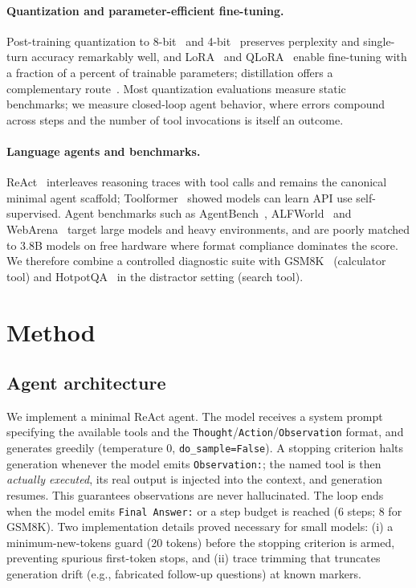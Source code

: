 \documentclass{article}
\begin{document}
\paragraph{Quantization and parameter-efficient fine-tuning.}
Post-training quantization to 8-bit~\cite{dettmers2022llmint8} and
4-bit~\cite{frantar2023gptq,dettmers2023qlora} preserves perplexity and
single-turn accuracy remarkably well, and LoRA~\cite{hu2022lora} and
QLoRA~\cite{dettmers2023qlora} enable fine-tuning with a fraction of a
percent of trainable parameters; distillation offers a complementary
route~\cite{gu2024minillm}. Most quantization evaluations measure static
benchmarks; we measure closed-loop agent behavior, where errors compound
across steps and the number of tool invocations is itself an outcome.

\paragraph{Language agents and benchmarks.}
ReAct~\cite{yao2023react} interleaves reasoning traces with tool calls
and remains the canonical minimal agent scaffold;
Toolformer~\cite{schick2023toolformer} showed models can learn API use
self-supervised. Agent benchmarks such as AgentBench~\cite{liu2024agentbench},
ALFWorld~\cite{shridhar2021alfworld} and WebArena~\cite{zhou2024webarena}
target large models and heavy environments, and are poorly matched to 3.8B
models on free hardware where format compliance dominates the score. We
therefore combine a controlled diagnostic suite with
GSM8K~\cite{cobbe2021gsm8k} (calculator tool) and
HotpotQA~\cite{yang2018hotpotqa} in the distractor setting (search tool).

\section{Method}
\label{sec:method}

\subsection{Agent architecture}
We implement a minimal ReAct agent. The model receives a system prompt
specifying the available tools and the
\texttt{Thought}/\texttt{Action}/\texttt{Observation} format, and
generates greedily (temperature 0, \texttt{do\_sample=False}). A stopping
criterion halts generation whenever the model emits
\texttt{Observation:}; the named tool is then \emph{actually executed},
its real output is injected into the context, and generation resumes.
This guarantees observations are never hallucinated. The loop ends when
the model emits \texttt{Final Answer:} or a step budget is reached (6
steps; 8 for GSM8K). Two implementation details proved necessary for
small models: (i) a minimum-new-tokens guard (20 tokens) before the
stopping criterion is armed, preventing spurious first-token stops, and
(ii) trace trimming that truncates generation drift (e.g., fabricated
follow-up questions) at known markers.
\end{document}
